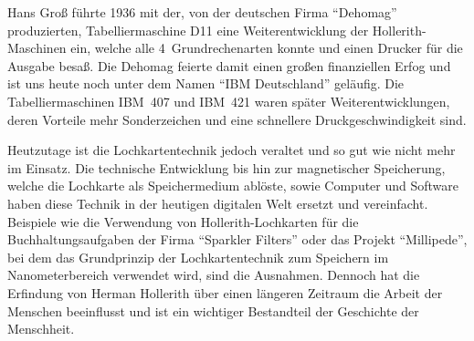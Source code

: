 \documentclass[parskip=half]{scrartcl}
\begin{document}
Hans Groß führte 1936 mit der, von der deutschen Firma \enquote{Dehomag} produzierten, Tabelliermaschine D11 eine Weiterentwicklung der Hollerith-Maschinen ein, 
welche alle 4~Grundrechenarten konnte und einen Drucker für die Ausgabe besaß. Die Dehomag feierte damit einen großen finanziellen Erfog und ist uns 
heute noch unter dem Namen \enquote{IBM Deutschland} geläufig. Die Tabelliermaschinen IBM~407 und IBM~421 waren später Weiterentwicklungen, deren Vorteile mehr Sonderzeichen und eine schnellere Druckgeschwindigkeit sind.

Heutzutage ist die Lochkartentechnik jedoch veraltet und so gut wie nicht mehr im Einsatz. Die technische Entwicklung bis hin zur 
magnetischer Speicherung, welche die Lochkarte als Speichermedium ablöste, sowie Computer und Software haben diese Technik in der heutigen digitalen Welt ersetzt und vereinfacht.
Beispiele wie die Verwendung von Hollerith-Lochkarten für die Buchhaltungsaufgaben der Firma 
\enquote{Sparkler Filters} oder das Projekt \enquote{Millipede}, bei dem das Grundprinzip der Lochkartentechnik 
zum Speichern im Nanometerbereich verwendet wird, sind die Ausnahmen. Dennoch hat die Erfindung von Herman Hollerith 
über einen längeren Zeitraum die Arbeit der Menschen beeinflusst und ist ein wichtiger Bestandteil der Geschichte der Menschheit.


\printbibliography
\end{document}
